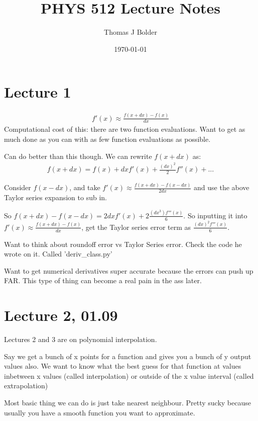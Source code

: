 \documentclass[12pt]{article}
\author{Thomas J Bolder}
\date{\today}
\title{PHYS 512 Lecture Notes}
\begin{document}
\maketitle
\newpage


\section{Lecture 1}

\begin{eqnarray}
    f'(x) \approx \frac{f(x+dx)-f(x)}{dx}
\end{eqnarray}
Computational cost of this: there are two function evaluations. Want to get as much done as you can with as few function evaluations as possible.

Can do better than this though. We can rewrite $f(x+dx)$ as:
\begin{eqnarray}
    f(x+dx) = f(x) +dx f'(x) + \frac{(dx)^2}{2} f''(x) + ...
\end{eqnarray}

Consider $f(x-dx)$, and take $f'(x) \approx \frac{f(x+dx)-f(x-dx)}{2dx}$ and use the above Taylor series expansion to sub in.

So $f(x+dx) - f(x-dx) = 2dx f'(x) + 2\frac{(dx^3)f'''(x)}{6}$.
So inputting it into $f'(x) \approx \frac{f(x+dx)-f(x)}{dx}$, get the Taylor series error term as $\frac{(dx)^2 f'''(x)}{6}$.

Want to think about roundoff error vs Taylor Series error. Check the code he wrote on it. Called 'deriv\_class.py'

Want to get numerical derivatives super accurate because the errors can push up FAR. This type of thing can become a real pain in the ass later.



\section{Lecture 2, 01.09}

Lectures 2 and 3 are on polynomial interpolation.

Say we get a bunch of x points for a function and gives you a bunch of y output values also. 
We want to know what the best guess for that function at values inbetween x values (called interpolation) or outside of the x value interval (called extrapolation)

Most basic thing we can do is just take nearest neighbour. Pretty sucky because usually you have a smooth function you want to approximate.
\end{document}
